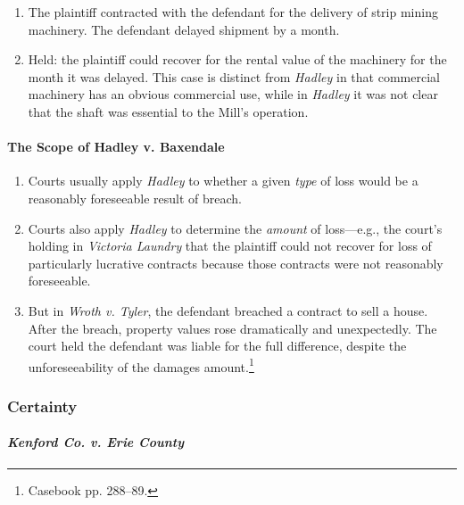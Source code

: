 \begin{enumerate}
    \item The plaintiff contracted with the defendant for the delivery of 
    strip mining machinery. The defendant delayed shipment by a month.
    \item Held: the plaintiff could recover for the rental value of the 
    machinery for the month it was delayed. This case is distinct from 
    \emph{Hadley} in that commercial machinery has an obvious commercial use, 
    while in \emph{Hadley} it was not clear that the shaft was essential to 
    the Mill's operation.
\end{enumerate}

\paragraph{The Scope of Hadley v. Baxendale}

\begin{enumerate}
    \item Courts usually apply \emph{Hadley} to whether a given \emph{type} of 
    loss would be a reasonably foreseeable result of breach.
    \item Courts also apply \emph{Hadley} to determine the \emph{amount} of 
    loss---e.g., the court's holding in \emph{Victoria Laundry} that the 
    plaintiff could not recover for loss of particularly lucrative contracts 
    because those contracts were not reasonably foreseeable.
    \item But in \emph{Wroth v. Tyler}, the defendant breached a contract to 
    sell a house. After the breach, property values rose dramatically and 
    unexpectedly. The court held the defendant was liable for the full 
    difference, despite the unforeseeability of the damages 
    amount.\footnote{Casebook pp. 288--89.}
\end{enumerate}

\subsubsection{Certainty}

\paragraph{\emph{Kenford Co. v. Erie County}}

